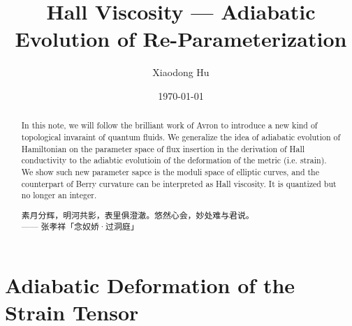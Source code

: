 \documentclass[10pt,nofootinbib,letterpaper]{revtex4}
\newcommand*{\kaishu}{\CJKfamily{kaishu}}
\newcounter{Def}[section]
\begin{document}
\title{Hall Viscosity --- Adiabatic Evolution of Re-Parameterization}
\author{Xiaodong Hu}

\date{\today}

\begin{abstract}
	In this note, we will follow the brilliant work of Avron \cite{avron1995viscosity} to introduce a new kind of topological invaraint of quantum fluids. We generalize the idea of adiabatic evolution of Hamiltonian on the parameter space of flux insertion in the derivation of Hall conductivity to the adiabtic evolutioin of the deformation of the metric (i.e. strain). We show such new parameter sapce is the moduli space of elliptic curves, and the counterpart of Berry curvature can be interpreted as Hall viscosity. It is quantized but no longer an integer.\par
		\hfill\par
		{\centering\kaishu 素月分辉，明河共影，表里俱澄澈。悠然心会，妙处难与君说。\\[0.5em]}
	\hfill------ 张孝祥「念奴娇·过洞庭」
\end{abstract}

\maketitle
\tableofcontents

\section{Adiabatic Deformation of the Strain Tensor}
\end{document}
